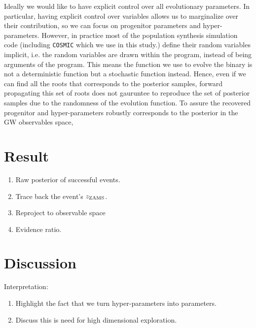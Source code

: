 \documentclass[twocolumn]{aastex631}
\begin{document}
Ideally we would like to have explicit control over all evolutionary parameters.
In particular, having explicit control over variables allows us to marginalize over their contribution, so we can focus on progenitor parameters and hyper-parameters.
However, in practice most of the population synthesis simulation code (including \texttt{COSMIC} which we use in this study.) define their random variables implicit,
i.e. the random variables are drawn within the program, instead of being arguments of the program.
This means the function we use to evolve the binary is not a deterministic function but a stochastic function instead. 
Hence, even if we can find all the roots that corresponds to the posterior samples,
forward propagating this set of roots does not gauruntee to reproduce the set of posterior samples due to the randomness of the evolution function.
To assure the recovered progenitor and hyper-parameters robustly corresponds to the posterior in the GW observables space,


\section{Result}

\begin{enumerate}
\item Raw posterior of successful events.
\item Trace back the event's $z_{\rm ZAMS}$.
\item Reproject to observable space
\item Evidence ratio.
\end{enumerate}




\section{Discussion}

Interpretation:
\begin{enumerate}
\item Highlight the fact that we turn hyper-parameters into parameters.
\item Discuss this is need for high dimensional exploration.
\end{enumerate}
\end{document}
